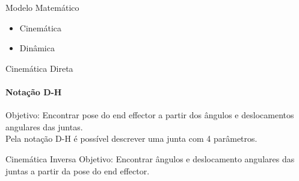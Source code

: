 \begin{frame}[c]{Modelo Matemático} 
    \begin{itemize}
        \item Cinemática
        \item Dinâmica
    \end{itemize}

\end{frame}
\begin{frame}[c]{Cinemática Direta} 
    \framesubtitle{Notação D-H}
    Objetivo: Encontrar pose do end effector a partir dos ângulos e deslocamentos angulares das juntas. \\
    Pela notação D-H é possível descrever uma junta com 4 parâmetros.\\
\end{frame}
\begin{frame}[c]{Cinemática Inversa} 
    Objetivo: Encontrar ângulos e deslocamento angulares das juntas a partir da pose do end effector.
\end{frame}

